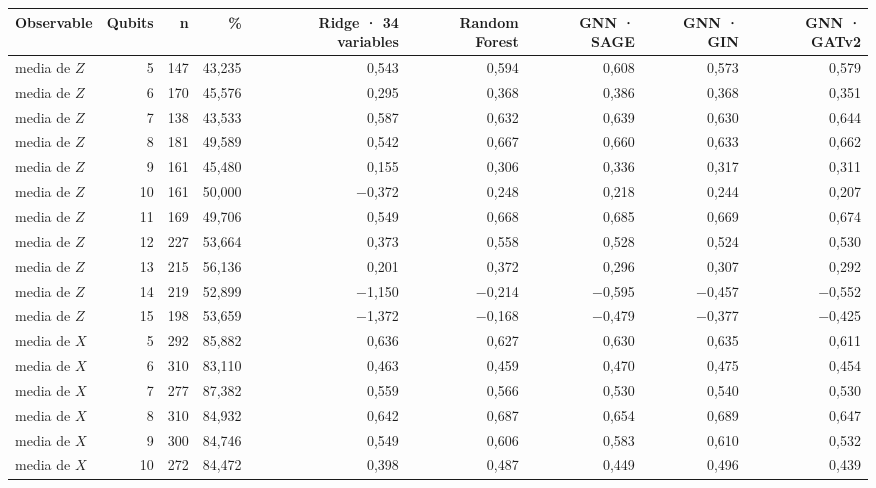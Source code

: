 \begin{table}[htbp]
    \centering
    {\footnotesize
    \begin{tabular}{@{}lrrrrrrrr@{}}
        \toprule
        \textbf{Observable} & \textbf{Qubits} & \textbf{n} & \textbf{\%} & \textbf{Ridge · 34 variables} & \textbf{Random Forest} & \textbf{GNN · SAGE} & \textbf{GNN · GIN} & \textbf{GNN · GATv2} \\
        \midrule
        media de $Z$ & 5 & 147 & 43,235 & 0,543 & 0,594 & 0,608 & 0,573 & 0,579 \\
        media de $Z$ & 6 & 170 & 45,576 & 0,295 & 0,368 & 0,386 & 0,368 & 0,351 \\
        media de $Z$ & 7 & 138 & 43,533 & 0,587 & 0,632 & 0,639 & 0,630 & 0,644 \\
        media de $Z$ & 8 & 181 & 49,589 & 0,542 & 0,667 & 0,660 & 0,633 & 0,662 \\
        media de $Z$ & 9 & 161 & 45,480 & 0,155 & 0,306 & 0,336 & 0,317 & 0,311 \\
        media de $Z$ & 10 & 161 & 50,000 & $-$0,372 & 0,248 & 0,218 & 0,244 & 0,207 \\
        media de $Z$ & 11 & 169 & 49,706 & 0,549 & 0,668 & 0,685 & 0,669 & 0,674 \\
        media de $Z$ & 12 & 227 & 53,664 & 0,373 & 0,558 & 0,528 & 0,524 & 0,530 \\
        media de $Z$ & 13 & 215 & 56,136 & 0,201 & 0,372 & 0,296 & 0,307 & 0,292 \\
        media de $Z$ & 14 & 219 & 52,899 & $-$1,150 & $-$0,214 & $-$0,595 & $-$0,457 & $-$0,552 \\
        media de $Z$ & 15 & 198 & 53,659 & $-$1,372 & $-$0,168 & $-$0,479 & $-$0,377 & $-$0,425 \\
        media de $X$ & 5 & 292 & 85,882 & 0,636 & 0,627 & 0,630 & 0,635 & 0,611 \\
        media de $X$ & 6 & 310 & 83,110 & 0,463 & 0,459 & 0,470 & 0,475 & 0,454 \\
        media de $X$ & 7 & 277 & 87,382 & 0,559 & 0,566 & 0,530 & 0,540 & 0,530 \\
        media de $X$ & 8 & 310 & 84,932 & 0,642 & 0,687 & 0,654 & 0,689 & 0,647 \\
        media de $X$ & 9 & 300 & 84,746 & 0,549 & 0,606 & 0,583 & 0,610 & 0,532 \\
        media de $X$ & 10 & 272 & 84,472 & 0,398 & 0,487 & 0,449 & 0,496 & 0,439 \\

\end{tabular}}
\end{table}
